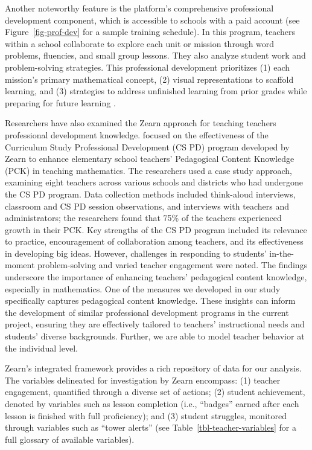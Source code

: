 \documentclass[
  number,
  preprint,
  3p,
  onecolumn]{elsarticle}
\begin{document}
Another noteworthy feature is the platform's comprehensive professional
development component, which is accessible to schools with a paid
account (see Figure~\ref{fig-prof-dev} for a sample training schedule).
In this program, teachers within a school collaborate to explore each
unit or mission through word problems, fluencies, and small group
lessons. They also analyze student work and problem-solving strategies.
This professional development prioritizes (1) each mission's primary
mathematical concept, (2) visual representations to scaffold learning,
and (3) strategies to address unfinished learning from prior grades
while preparing for future learning \citep{morrison2019}.

Researchers have also examined the Zearn approach for teaching teachers
professional development knowledge. \citep{knudsen2020a} focused on the
effectiveness of the Curriculum Study Professional Development (CS PD)
program developed by Zearn to enhance elementary school teachers'
Pedagogical Content Knowledge (PCK) in teaching mathematics. The
researchers used a case study approach, examining eight teachers across
various schools and districts who had undergone the CS PD program. Data
collection methods included think-aloud interviews, classroom and CS PD
session observations, and interviews with teachers and administrators;
the researchers found that 75\% of the teachers experienced growth in
their PCK. Key strengths of the CS PD program included its relevance to
practice, encouragement of collaboration among teachers, and its
effectiveness in developing big ideas. However, challenges in responding
to students' in-the-moment problem-solving and varied teacher engagement
were noted. The findings underscore the importance of enhancing
teachers' pedagogical content knowledge, especially in mathematics. One
of the measures we developed in our study specifically captures
pedagogical content knowledge. These insights can inform the development
of similar professional development programs in the current project,
ensuring they are effectively tailored to teachers' instructional needs
and students' diverse backgrounds. Further, we are able to model teacher
behavior at the individual level.

Zearn's integrated framework provides a rich repository of data for our
analysis. The variables delineated for investigation by Zearn encompass:
(1) teacher engagement, quantified through a diverse set of actions; (2)
student achievement, denoted by variables such as lesson completion
(i.e., ``badges'' earned after each lesson is finished with full
proficiency); and (3) student struggles, monitored through variables
such as ``tower alerts'' (see Table~\ref{tbl-teacher-variables} for a
full glossary of available variables).
\end{document}
